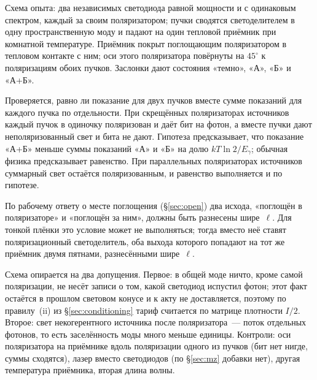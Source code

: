 \documentclass[11pt,a4paper]{article}
\newcommand{\Sref}[1]{\hyperref[#1]{\S\ref{#1}}}
\begin{document}
Схема опыта: два независимых светодиода равной мощности и с одинаковым спектром, каждый за своим поляризатором; пучки сводятся светоделителем в одну пространственную моду и падают на один тепловой приёмник при комнатной температуре. Приёмник покрыт поглощающим поляризатором в тепловом контакте с ним; оси этого поляризатора повёрнуты на $45^\circ$ к поляризациям обоих пучков. Заслонки дают состояния «темно», «А», «Б» и «А+Б».

Проверяется, равно ли показание для двух пучков вместе сумме показаний для каждого пучка по отдельности. При скрещённых поляризаторах источников каждый пучок в одиночку поляризован и даёт бит на фотон, а вместе пучки дают неполяризованный свет и бита не дают. Гипотеза предсказывает, что показание «А+Б» меньше суммы показаний «А» и «Б» на долю $kT\ln 2/E_\gamma$; обычная физика предсказывает равенство. При параллельных поляризаторах источников суммарный свет остаётся поляризованным, и равенство выполняется и по гипотезе.

По рабочему ответу о месте поглощения (\Sref{sec:open}) два исхода, «поглощён в поляризаторе» и «поглощён за ним», должны быть разнесены шире~$\ell$. Для тонкой плёнки это условие может не выполняться; тогда вместо неё ставят поляризационный светоделитель, оба выхода которого попадают на тот же приёмник двумя пятнами, разнесёнными шире~$\ell$.

Схема опирается на два допущения. Первое: в общей моде ничто, кроме самой поляризации, не несёт записи о том, какой светодиод испустил фотон; этот факт остаётся в прошлом световом конусе и к акту не доставляется, поэтому по правилу~(ii) из \Sref{sec:conditioning} тариф считается по матрице плотности $I/2$. Второе: свет некогерентного источника после поляризатора~--- поток отдельных фотонов, то есть заселённость моды много меньше единицы. Контроли: оси поляризатора на приёмнике вдоль поляризации одного из пучков (бит нет нигде, суммы сходятся), лазер вместо светодиодов (по \Sref{sec:mz} добавки нет), другая температура приёмника, вторая длина волны.
\end{document}
